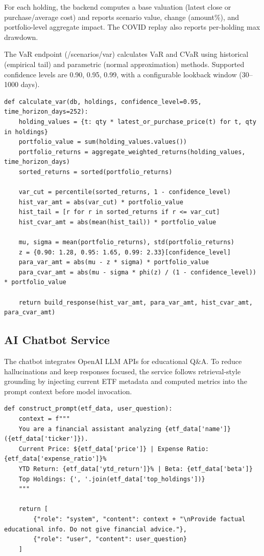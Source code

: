 For each holding, the backend computes a base valuation (latest close or purchase/average cost) and reports scenario value, change (amount\%), and portfolio-level aggregate impact. The COVID replay also reports per-holding max drawdown.

The VaR endpoint (/scenarios/var) calculates VaR and CVaR using historical (empirical tail) and parametric (normal approximation) methods. Supported confidence levels are 0.90, 0.95, 0.99, with a configurable lookback window (30–1000 days).

\begin{lstlisting}[style=pythonstyle, caption={Implemented Portfolio VaR/CVaR Flow (Simplified)}, basicstyle=\ttfamily\footnotesize ]
def calculate_var(db, holdings, confidence_level=0.95, time_horizon_days=252):
    holding_values = {t: qty * latest_or_purchase_price(t) for t, qty in holdings}
    portfolio_value = sum(holding_values.values())
    portfolio_returns = aggregate_weighted_returns(holding_values, time_horizon_days)
    sorted_returns = sorted(portfolio_returns)

    var_cut = percentile(sorted_returns, 1 - confidence_level)
    hist_var_amt = abs(var_cut) * portfolio_value
    hist_tail = [r for r in sorted_returns if r <= var_cut]
    hist_cvar_amt = abs(mean(hist_tail)) * portfolio_value

    mu, sigma = mean(portfolio_returns), std(portfolio_returns)
    z = {0.90: 1.28, 0.95: 1.65, 0.99: 2.33}[confidence_level]
    para_var_amt = abs(mu - z * sigma) * portfolio_value
    para_cvar_amt = abs(mu - sigma * phi(z) / (1 - confidence_level)) * portfolio_value

    return build_response(hist_var_amt, para_var_amt, hist_cvar_amt, para_cvar_amt)
\end{lstlisting}

\subsection{AI Chatbot Service}

The chatbot integrates OpenAI LLM APIs for educational Q\&A. To reduce hallucinations and keep responses focused, the service follows retrieval-style grounding by injecting current ETF metadata and computed metrics into the prompt context before model invocation.

\begin{lstlisting}[style=pythonstyle, caption={AI System Prompt Construction}, basicstyle=\ttfamily\footnotesize]
def construct_prompt(etf_data, user_question):
    context = f"""
    You are a financial assistant analyzing {etf_data['name']} ({etf_data['ticker']}).
    Current Price: ${etf_data['price']} | Expense Ratio: {etf_data['expense_ratio']}%
    YTD Return: {etf_data['ytd_return']}% | Beta: {etf_data['beta']}
    Top Holdings: {', '.join(etf_data['top_holdings'])}
    """
    
    return [
        {"role": "system", "content": context + "\nProvide factual educational info. Do not give financial advice."},
        {"role": "user", "content": user_question}
    ]
\end{lstlisting}

